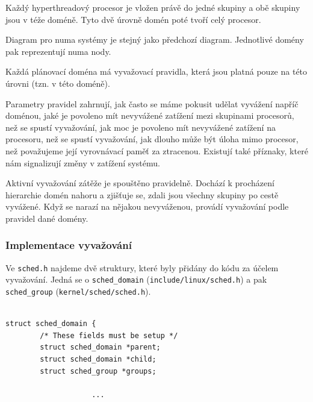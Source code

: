 \documentclass[
  field=ainfk,
  biblatex,
  glossaries,
  index
]{kidiplom}
\begin{document}
Každý hyperthreadový procesor je vložen právě do jedné skupiny a obě skupiny jsou v téže doméně. Tyto dvě úrovně domén poté tvoří celý procesor. 

Diagram pro numa systémy je stejný jako předchozí diagram. Jednotlivé domény pak reprezentují numa nody. 


Každá plánovací doména má vyvažovací pravidla, která jsou platná pouze na této úrovni (tzn. v této doméně). 

Parametry pravidel zahrnují, jak často se máme pokusit udělat vyvážení napříč doménou, jaké je povoleno mít nevyvážené zatížení mezi skupinami procesorů, než se spustí vyvažování, jak moc je povoleno mít nevyvážené zatížení na procesoru, než se spustí vyvažování, jak dlouho může být úloha mimo procesor, než považujeme její vyrovnávací paměť za ztracenou.
Existují také příznaky, které nám signalizují změny v zatížení systému. 

Aktivní vyvažování zátěže je spouštěno pravidelně. Dochází k procházení hierarchie domén nahoru a zjišťuje se, zdali jsou všechny skupiny po cestě vyvážené. Když se narazí na nějakou nevyváženou, provádí vyvažování podle pravidel dané domény.

\newpage
\subsubsection{Implementace vyvažování}

Ve \verb#sched.h# najdeme dvě struktury, které byly přidány do kódu za účelem vyvažování. Jedná se o \verb#sched_domain# (\verb#include/linux/sched.h#) a pak \verb#sched_group# (\verb#kernel/sched/sched.h#).

\begin{verbatim} 

struct sched_domain {
        /* These fields must be setup */
        struct sched_domain *parent;
        struct sched_domain *child;
        struct sched_group *groups;

                	...

\end{verbatim} 
\end{document}
